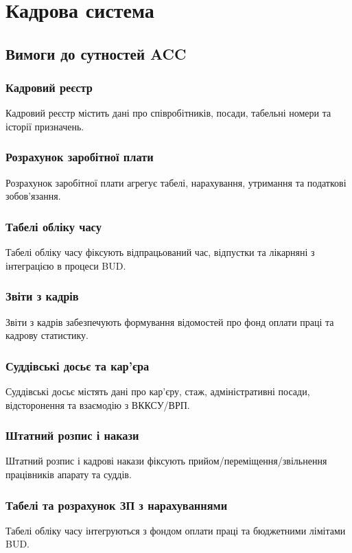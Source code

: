 \documentclass{article}
\begin{document}
\newpage
\section{Кадрова система}

\subsection{Вимоги до сутностей ACC}

\subsubsection{Кадровий реєстр}
Кадровий реєстр містить дані про співробітників, посади, табельні номери та історії призначень.

\subsubsection{Розрахунок заробітної плати}
Розрахунок заробітної плати агрегує табелі, нарахування, утримання та податкові зобов’язання.

\subsubsection{Табелі обліку часу}
Табелі обліку часу фіксують відпрацьований час, відпустки та лікарняні з інтеграцією в процеси BUD.

\subsubsection{Звіти з кадрів}
Звіти з кадрів забезпечують формування відомостей про фонд оплати праці та кадрову статистику.

\subsubsection{Суддівські досьє та кар’єра}
Суддівські досьє містять дані про кар’єру, стаж, адміністративні посади, відсторонення та взаємодію з ВККСУ/ВРП.

\subsubsection{Штатний розпис і накази}
Штатний розпис і кадрові накази фіксують прийом/переміщення/звільнення працівників апарату та суддів.

\subsubsection{Табелі та розрахунок ЗП з нарахуваннями}
Табелі обліку часу інтегруються з фондом оплати праці та бюджетними лімітами BUD.
\end{document}
